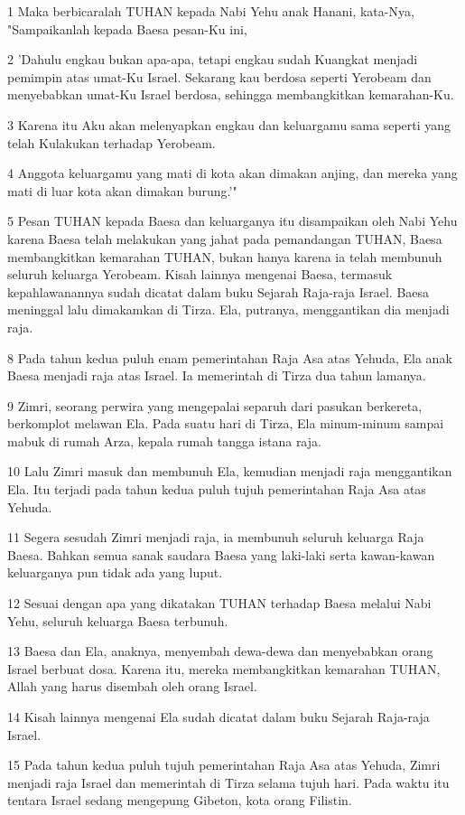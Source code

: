 \par 1 Maka berbicaralah TUHAN kepada Nabi Yehu anak Hanani, kata-Nya, "Sampaikanlah kepada Baesa pesan-Ku ini,
\par 2 'Dahulu engkau bukan apa-apa, tetapi engkau sudah Kuangkat menjadi pemimpin atas umat-Ku Israel. Sekarang kau berdosa seperti Yerobeam dan menyebabkan umat-Ku Israel berdosa, sehingga membangkitkan kemarahan-Ku.
\par 3 Karena itu Aku akan melenyapkan engkau dan keluargamu sama seperti yang telah Kulakukan terhadap Yerobeam.
\par 4 Anggota keluargamu yang mati di kota akan dimakan anjing, dan mereka yang mati di luar kota akan dimakan burung.'"
\par 5 Pesan TUHAN kepada Baesa dan keluarganya itu disampaikan oleh Nabi Yehu karena Baesa telah melakukan yang jahat pada pemandangan TUHAN, Baesa membangkitkan kemarahan TUHAN, bukan hanya karena ia telah membunuh seluruh keluarga Yerobeam. Kisah lainnya mengenai Baesa, termasuk kepahlawanannya sudah dicatat dalam buku Sejarah Raja-raja Israel. Baesa meninggal lalu dimakamkan di Tirza. Ela, putranya, menggantikan dia menjadi raja.
\par 8 Pada tahun kedua puluh enam pemerintahan Raja Asa atas Yehuda, Ela anak Baesa menjadi raja atas Israel. Ia memerintah di Tirza dua tahun lamanya.
\par 9 Zimri, seorang perwira yang mengepalai separuh dari pasukan berkereta, berkomplot melawan Ela. Pada suatu hari di Tirza, Ela minum-minum sampai mabuk di rumah Arza, kepala rumah tangga istana raja.
\par 10 Lalu Zimri masuk dan membunuh Ela, kemudian menjadi raja menggantikan Ela. Itu terjadi pada tahun kedua puluh tujuh pemerintahan Raja Asa atas Yehuda.
\par 11 Segera sesudah Zimri menjadi raja, ia membunuh seluruh keluarga Raja Baesa. Bahkan semua sanak saudara Baesa yang laki-laki serta kawan-kawan keluarganya pun tidak ada yang luput.
\par 12 Sesuai dengan apa yang dikatakan TUHAN terhadap Baesa melalui Nabi Yehu, seluruh keluarga Baesa terbunuh.
\par 13 Baesa dan Ela, anaknya, menyembah dewa-dewa dan menyebabkan orang Israel berbuat dosa. Karena itu, mereka membangkitkan kemarahan TUHAN, Allah yang harus disembah oleh orang Israel.
\par 14 Kisah lainnya mengenai Ela sudah dicatat dalam buku Sejarah Raja-raja Israel.
\par 15 Pada tahun kedua puluh tujuh pemerintahan Raja Asa atas Yehuda, Zimri menjadi raja Israel dan memerintah di Tirza selama tujuh hari. Pada waktu itu tentara Israel sedang mengepung Gibeton, kota orang Filistin.
